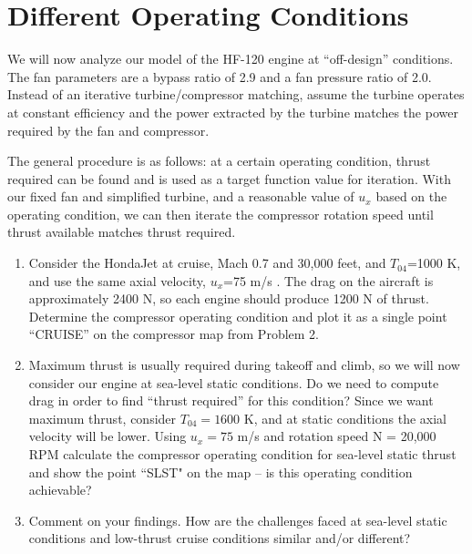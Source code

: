 \documentclass[11pt]{article}
\begin{document}
\section{Different Operating Conditions}
We will now analyze our model of the HF-120 engine at ``off-design'' conditions. The fan parameters are a bypass ratio of 2.9 and a fan pressure ratio of 2.0. Instead of an iterative turbine/compressor matching, assume the turbine operates at constant efficiency and the power extracted by the turbine matches the power required by the fan and compressor.

The general procedure is as follows: at a certain operating condition, thrust required can be found and is used as a target function value for iteration. With our fixed fan and simplified turbine, and a reasonable value of $u_x$ based on the operating condition, we can then iterate the compressor rotation speed until thrust available matches thrust required.
\begin{enumerate}[label=(\alph*)]
	\item
    	Consider the HondaJet at cruise, Mach 0.7 and 30,000 feet, and $T_{04}$=1000 K, and use the same axial velocity, $u_x$=75 m/s . The drag on the aircraft is approximately 2400 N, so each engine should produce 1200 N of thrust. Determine the compressor operating condition and plot it as a single point “CRUISE” on the compressor map from Problem 2.
   	\item
    	Maximum thrust is usually required during takeoff and climb, so we will now consider our engine at sea-level static conditions. Do we need to compute drag in order to find ``thrust required'' for this condition? Since we want maximum thrust, consider $T_{04}=1600$ K, and at static conditions the axial velocity will be lower. Using $u_x=75$ m/s and rotation speed N = 20,000 RPM calculate the compressor operating condition for sea-level static thrust and show the point ``SLST" on the map – is this operating condition achievable?
   	\item
    	Comment on your findings. How are the challenges faced at sea-level static conditions and low-thrust cruise conditions similar and/or different?
\end{enumerate}
\end{document}
